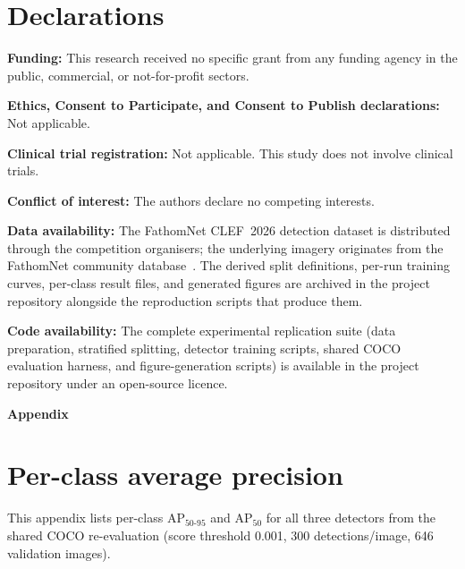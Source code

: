 \documentclass[11pt,a4paper,twocolumn]{article}
\begin{document}
\section*{Declarations}

\noindent\textbf{Funding:} This research received no specific grant from
any funding agency in the public, commercial, or not-for-profit sectors.

\noindent\textbf{Ethics, Consent to Participate, and Consent to Publish declarations:} Not applicable.

\noindent\textbf{Clinical trial registration:} Not applicable. This study does not involve clinical trials.

\noindent\textbf{Conflict of interest:} The authors declare no competing interests.

\noindent\textbf{Data availability:} The FathomNet CLEF~2026 detection
dataset is distributed through the competition organisers; the underlying
imagery originates from the FathomNet community
database~\cite{fathomnet2022}. The derived split definitions, per-run training curves, per-class result files,
and generated figures are archived in the project repository alongside
the reproduction scripts that produce them.

\noindent\textbf{Code availability:} The complete experimental replication suite
(data preparation, stratified splitting, detector training scripts, shared
COCO evaluation harness, and figure-generation scripts) is available in
the project repository under an open-source licence.


\clearpage
\onecolumn
\raggedbottom
\appendix
\begin{center}
\Large\textbf{Appendix}
\end{center}
\vspace{1em}
\section{Per-class average precision}
\label{app:perclass}
This appendix lists per-class AP$_{50\text{-}95}$ and AP$_{50}$ for all three detectors from the shared COCO re-evaluation (score threshold 0.001, 300 detections/image, 646 validation images).
\end{document}

